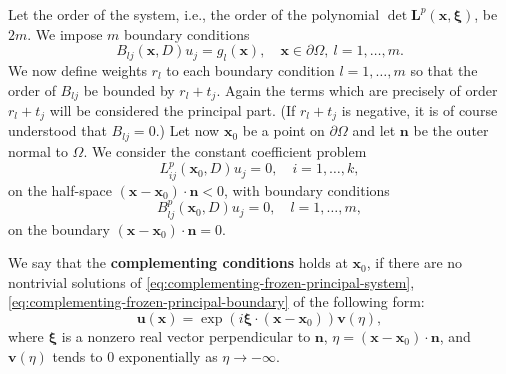 Let the order of the system, i.e., the order of the polynomial $\det\bm{L}^p(\bm{x},\bm{\xi})$, be $2m$. We impose $m$ boundary conditions
\begin{equation}\label{eq:weighted-elliptic-general-boundary-conditions}
B_{lj}(\bm{x},D)u_j=g_l(\bm{x}),\quad\bm{x}\in\partial\Omega,\ l=1,\ldots,m.
\end{equation}
We now define weights $r_l$ to each boundary condition $l=1,\ldots,m$ so that the order of $B_{lj}$ be bounded by $r_l+t_j$. Again the terms which are precisely of order $r_l+t_j$ will be considered the principal part. (If $r_l+t_j$ is negative, it is of course understood that $B_{lj}=0$.) Let now $\bm{x}_0$ be a point on $\partial\Omega$ and let $\bm{n}$ be the outer normal to $\Omega$. We consider the constant coefficient problem
\begin{equation}\label{eq:complementing-frozen-principal-system}
L_{ij}^p(\bm{x}_0,D)u_j=0,\quad i=1,\ldots,k,
\end{equation}
on the half-space $(\bm{x}-\bm{x}_0)\cdot\bm{n}<0$, with boundary conditions
\begin{equation}\label{eq:complementing-frozen-principal-boundary}
B_{lj}^p(\bm{x}_0,D)u_j=0,\quad l=1,\ldots,m,
\end{equation}
on the boundary $(\bm{x}-\bm{x}_0)\cdot\bm{n}=0$.

\begin{Definition}
\label{def:elliptic-system-complementing-condition}
We say that the \textbf{complementing conditions} holds at $\bm{x}_0$, if there are no nontrivial solutions of \eqref{eq:complementing-frozen-principal-system}, \eqref{eq:complementing-frozen-principal-boundary} of the following form:
\begin{equation}\label{eq:complementing-decaying-tangential-mode}
\bm{u}(\bm{x})=\exp(i\bm{\xi}\cdot(\bm{x}-\bm{x}_0))\bm{v}(\eta),
\end{equation}
where $\bm{\xi}$ is a nonzero real vector perpendicular to $\bm{n}$, $\eta=(\bm{x}-\bm{x}_0)\cdot\bm{n}$, and $\bm{v}(\eta)$ tends to $0$ exponentially as $\eta\to-\infty$.
\end{Definition}
